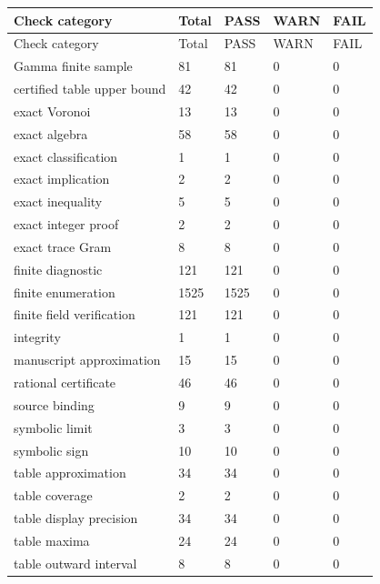 {\small
\begin{longtable}{@{}p{64mm}p{15mm}p{15mm}p{15mm}p{15mm}@{}}
\toprule
Check category & Total & PASS & WARN & FAIL \\
\midrule\endfirsthead
\toprule
Check category & Total & PASS & WARN & FAIL \\
\midrule\endhead
\bottomrule\endfoot
Gamma finite sample & 81 & 81 & 0 & 0 \\
certified table upper bound & 42 & 42 & 0 & 0 \\
exact Voronoi & 13 & 13 & 0 & 0 \\
exact algebra & 58 & 58 & 0 & 0 \\
exact classification & 1 & 1 & 0 & 0 \\
exact implication & 2 & 2 & 0 & 0 \\
exact inequality & 5 & 5 & 0 & 0 \\
exact integer proof & 2 & 2 & 0 & 0 \\
exact trace Gram & 8 & 8 & 0 & 0 \\
finite diagnostic & 121 & 121 & 0 & 0 \\
finite enumeration & 1525 & 1525 & 0 & 0 \\
finite field verification & 121 & 121 & 0 & 0 \\
integrity & 1 & 1 & 0 & 0 \\
manuscript approximation & 15 & 15 & 0 & 0 \\
rational certificate & 46 & 46 & 0 & 0 \\
source binding & 9 & 9 & 0 & 0 \\
symbolic limit & 3 & 3 & 0 & 0 \\
symbolic sign & 10 & 10 & 0 & 0 \\
table approximation & 34 & 34 & 0 & 0 \\
table coverage & 2 & 2 & 0 & 0 \\
table display precision & 34 & 34 & 0 & 0 \\
table maxima & 24 & 24 & 0 & 0 \\
table outward interval & 8 & 8 & 0 & 0 \\
\end{longtable}
}
